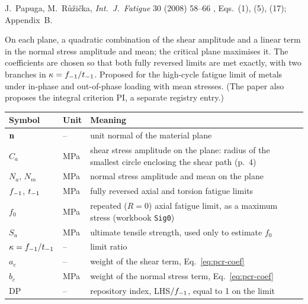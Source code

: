 \label{sheet:PCR}

 J.~Papuga, M.~R\r{u}\v{z}i\v{c}ka, \emph{Int.\ J.\ Fatigue} 30 (2008) 58--66
\cite{papuga2008}, Eqs.~(1), (5), (17); Appendix~B.

 On each plane, a quadratic combination of the shear amplitude and a linear term
in the normal stress amplitude and mean; the critical plane maximises it. The coefficients are chosen
so that both fully reversed limits are met exactly, with two branches in $\kappa=f_{-1}/t_{-1}$. Proposed
for the high-cycle fatigue limit of metals under in-phase and out-of-phase loading with mean stresses.
(The paper also proposes the integral criterion PI, a separate registry entry.)

\begin{center}\small
\begin{tabular}{@{}llp{100mm}@{}}
\toprule
Symbol & Unit & Meaning\\\midrule
$\mathbf n$ & -- & unit normal of the material plane\\
$C_a$ & MPa & shear stress amplitude on the plane: radius of the smallest circle enclosing the shear path (p.~4)\\
$N_a$, $N_m$ & MPa & normal stress amplitude and mean on the plane\\
$f_{-1}$, $t_{-1}$ & MPa & fully reversed axial and torsion fatigue limits\\
$f_0$ & MPa & repeated ($R=0$) axial fatigue limit, as a maximum stress (workbook \texttt{Sig0})\\
$S_u$ & MPa & ultimate tensile strength, used only to estimate $f_0$\\
$\kappa=f_{-1}/t_{-1}$ & -- & limit ratio\\
$a_c$ & -- & weight of the shear term, Eq.~\eqref{eq:pcr-coef}\\
$b_c$ & MPa & weight of the normal stress term, Eq.~\eqref{eq:pcr-coef}\\
$\mathrm{DP}$ & -- & repository index, LHS$/f_{-1}$, equal to 1 on the limit\\
\bottomrule
\end{tabular}
\end{center}


